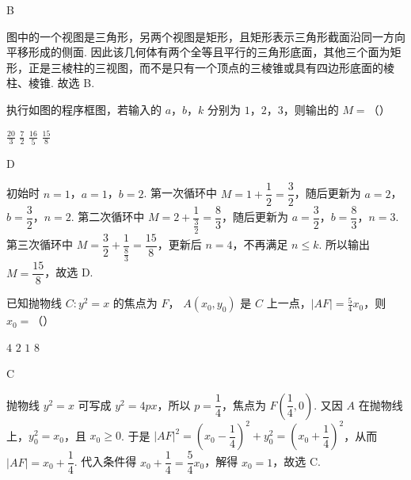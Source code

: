 \begin{answer}
B
\end{answer}

\begin{solution}
图中的一个视图是三角形，另两个视图是矩形，且矩形表示三角形截面沿同一方向平移形成的侧面. 因此该几何体有两个全等且平行的三角形底面，其他三个面为矩形，正是三棱柱的三视图，而不是只有一个顶点的三棱锥或具有四边形底面的棱柱、棱锥. 故选 B.
\end{solution}

\begin{problem}
执行如图的程序框图，若输入的 \(a\)，\(b\)，\(k\) 分别为 \(1\)，\(2\)，\(3\)，则输出的 \(M =\)（\quad）


\choices
    {\(\frac{20}{3}\)}
    {\(\frac{7}{2}\)}
    {\(\frac{16}{5}\)}
    {\(\frac{15}{8}\)}
\end{problem}

\begin{answer}
D
\end{answer}

\begin{solution}
初始时 \(n=1\)，\(a=1\)，\(b=2\). 第一次循环中 \(M=1+\dfrac{1}{2}=\dfrac{3}{2}\)，随后更新为 \(a=2\)，\(b=\dfrac{3}{2}\)，\(n=2\). 第二次循环中 \(M=2+\dfrac{1}{\frac{3}{2}}=\dfrac{8}{3}\)，随后更新为 \(a=\dfrac{3}{2}\)，\(b=\dfrac{8}{3}\)，\(n=3\). 第三次循环中 \(M=\dfrac{3}{2}+\dfrac{1}{\frac{8}{3}}=\dfrac{15}{8}\)，更新后 \(n=4\)，不再满足 \(n\leqslant k\). 所以输出 \(M=\dfrac{15}{8}\)，故选 D.
\end{solution}

\begin{problem}
已知抛物线 \(C: y^{2} = x\) 的焦点为 \(F\)， \(A(x_{0}, y_{0})\) 是 \(C\) 上一点，\(|AF| = \frac{5}{4} x_{0}\)，则 \(x_{0} =\)（\quad）

\choices
    {\(4\)}
    {\(2\)}
    {\(1\)}
    {\(8\)}
\end{problem}

\begin{answer}
C
\end{answer}

\begin{solution}
抛物线 \(y^2=x\) 可写成 \(y^2=4px\)，所以 \(p=\dfrac14\)，焦点为 \(F\left(\dfrac14,0\right)\). 又因 \(A\) 在抛物线上，\(y_0^2=x_0\)，且 \(x_0\geqslant0\). 于是
\(\lvert AF\rvert^2=\left(x_0-\dfrac14\right)^2+y_0^2=\left(x_0+\dfrac14\right)^2\)，从而 \(\lvert AF\rvert=x_0+\dfrac14\). 代入条件得 \(x_0+\dfrac14=\dfrac54x_0\)，解得 \(x_0=1\)，故选 C.
\end{solution}

